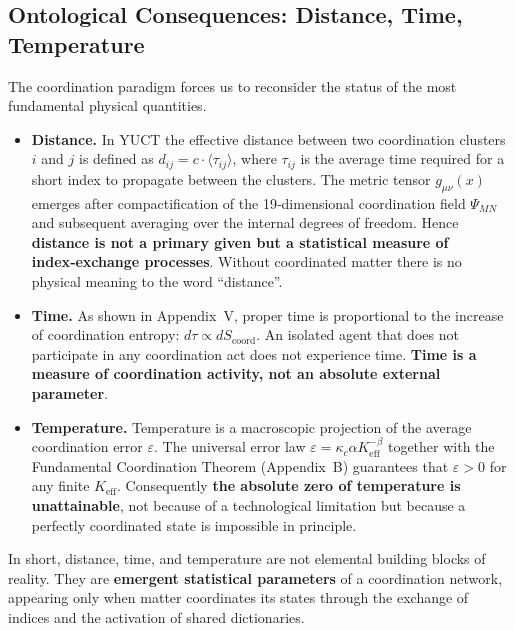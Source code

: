 \documentclass[12pt,a4paper]{article}
\begin{document}
\subsection{Ontological Consequences: Distance, Time, Temperature}

The coordination paradigm forces us to reconsider the status of the most fundamental
physical quantities.

\begin{itemize}
	\item \textbf{Distance.} In YUCT the effective distance between two coordination
	clusters \(i\) and \(j\) is defined as \(d_{ij} = c \cdot \langle \tau_{ij} \rangle\),
	where \(\tau_{ij}\) is the average time required for a short index to propagate
	between the clusters. The metric tensor \(g_{\mu\nu}(x)\) emerges after
	compactification of the 19‑dimensional coordination field \(\Psi_{MN}\) and subsequent
	averaging over the internal degrees of freedom. Hence \textbf{distance is not a
		primary given but a statistical measure of index‑exchange processes}. Without
	coordinated matter there is no physical meaning to the word ``distance''.
	
	\item \textbf{Time.} As shown in Appendix~V, proper time is proportional to the
	increase of coordination entropy: \(d\tau \propto dS_{\mathrm{coord}}\). An isolated
	agent that does not participate in any coordination act does not experience time.
	\textbf{Time is a measure of coordination activity, not an absolute external
		parameter}.
	
	\item \textbf{Temperature.} Temperature is a macroscopic projection of the average
	coordination error \(\varepsilon\). The universal error law
	\(\varepsilon = \kappa_c \alpha K_{\mathrm{eff}}^{-\beta}\) together with the
	Fundamental Coordination Theorem (Appendix~B) guarantees that
	\(\varepsilon > 0\) for any finite \(K_{\mathrm{eff}}\). Consequently
	\textbf{the absolute zero of temperature is unattainable}, not because of a
	technological limitation but because a perfectly coordinated state is impossible in
	principle.
\end{itemize}

In short, distance, time, and temperature are not elemental building blocks of reality.
They are \textbf{emergent statistical parameters} of a coordination network, appearing
only when matter coordinates its states through the exchange of indices and the
activation of shared dictionaries.
\end{document}
